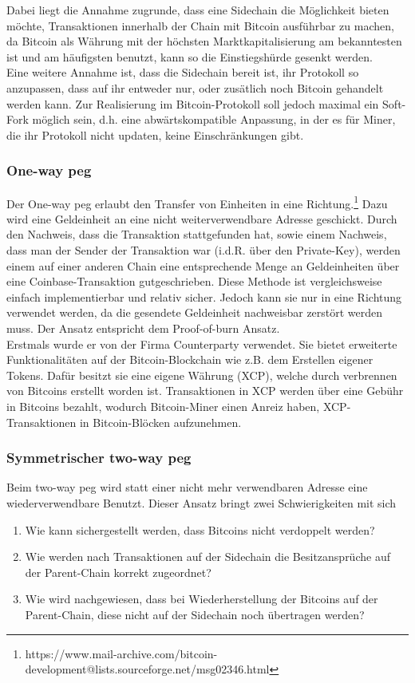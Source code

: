 Dabei liegt die Annahme zugrunde, dass eine Sidechain die Möglichkeit bieten möchte, Transaktionen innerhalb der Chain mit Bitcoin ausführbar zu machen, da Bitcoin als Währung mit der höchsten Marktkapitalisierung am bekanntesten ist und am häufigsten benutzt, kann so die Einstiegshürde gesenkt werden. \\
Eine weitere Annahme ist, dass die Sidechain bereit ist, ihr Protokoll so anzupassen, dass auf ihr entweder nur, oder zusätlich noch Bitcoin gehandelt werden kann. Zur Realisierung im Bitcoin-Protokoll soll jedoch maximal ein Soft-Fork möglich sein, d.h. eine abwärtskompatible Anpassung, in der es für Miner, die ihr Protokoll nicht updaten, keine Einschränkungen gibt.
\subsubsection{One-way peg}
Der One-way peg erlaubt den Transfer von Einheiten in eine Richtung.\footnote{https://www.mail-archive.com/bitcoin-development@lists.sourceforge.net/msg02346.html} Dazu wird eine Geldeinheit an eine nicht weiterverwendbare Adresse geschickt. Durch den Nachweis, dass die Transaktion stattgefunden hat, sowie einem Nachweis, dass man der Sender der Transaktion war (i.d.R. über den Private-Key), werden einem auf einer anderen Chain eine entsprechende Menge an Geldeinheiten über eine Coinbase-Transaktion gutgeschrieben. Diese Methode ist vergleichsweise einfach implementierbar und relativ sicher. Jedoch kann sie nur in eine Richtung verwendet werden, da die gesendete Geldeinheit nachweisbar zerstört werden muss. Der Ansatz entspricht dem Proof-of-burn Ansatz.\\ 
Erstmals wurde er von der Firma Counterparty verwendet. Sie bietet erweiterte Funktionalitäten auf der Bitcoin-Blockchain wie z.B. dem Erstellen eigener Tokens. Dafür besitzt sie eine eigene Währung (XCP), welche durch \glqq verbrennen\grqq{} von Bitcoins erstellt worden ist. Transaktionen in XCP werden über eine Gebühr in Bitcoins bezahlt, wodurch Bitcoin-Miner einen Anreiz haben, XCP-Transaktionen in Bitcoin-Blöcken aufzunehmen.
\subsubsection{Symmetrischer two-way peg}
Beim two-way peg wird statt einer nicht mehr verwendbaren Adresse eine wiederverwendbare Benutzt. Dieser Ansatz bringt zwei Schwierigkeiten mit sich
\begin{enumerate}
	\item Wie kann sichergestellt werden, dass Bitcoins nicht verdoppelt werden? 
	\item Wie werden nach Transaktionen auf der Sidechain die Besitzansprüche auf der Parent-Chain korrekt zugeordnet?
	\item Wie wird nachgewiesen, dass bei \glqq Wiederherstellung\grqq{} der Bitcoins auf der Parent-Chain, diese nicht auf der Sidechain noch übertragen werden?
\end{enumerate}

